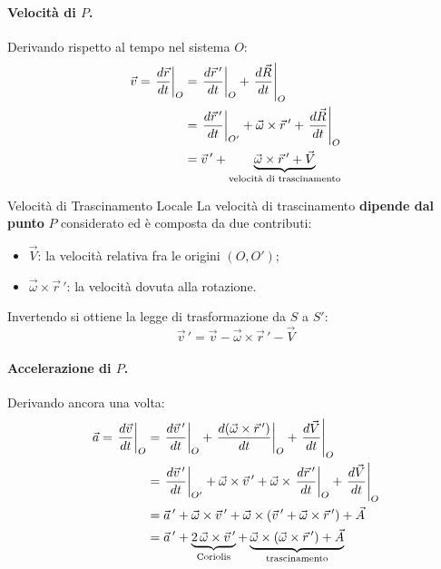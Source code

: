 \paragraph{Velocità di $P$.}
Derivando rispetto al tempo nel sistema $O$:
\begin{align}
    \vec{v} = \left.\frac{d\vec{r}}{dt}\right|_{O}
      &= \left.\frac{d\vec{r}\,'}{dt}\right|_{O} + \left.\frac{d\vec{R}}{dt}\right|_{O} \notag \\
      &= \left.\frac{d\vec{r}\,'}{dt}\right|_{O'} + \vec{\omega}\times\vec{r}\,' + \left.\frac{d\vec{R}}{dt}\right|_{O} \notag \\
      &= \vec{v}\,' + \underbrace{\vec{\omega}\times\vec{r}\,' + \vec{V}}_{\text{velocità di trascinamento}}
\end{align}

\begin{definizione}{Velocità di Trascinamento Locale}
La velocità di trascinamento \textbf{dipende dal punto} $P$ considerato ed è composta da due contributi:
\begin{itemize}[leftmargin=1.4em]
    \item $\vec{V}$: la velocità relativa fra le origini $(O, O')$;
    \item $\vec{\omega}\times\vec{r}\,'$: la velocità dovuta alla rotazione.
\end{itemize}
Invertendo si ottiene la legge di trasformazione da $S$ a $S'$:
\begin{equation}
    \vec{v}\,' = \vec{v} - \vec{\omega}\times\vec{r}\,' - \vec{V}
\end{equation}
\end{definizione}

\paragraph{Accelerazione di $P$.}
Derivando ancora una volta:
\begin{align}
    \vec{a} = \left.\frac{d\vec{v}}{dt}\right|_{O}
      &= \left.\frac{d\vec{v}\,'}{dt}\right|_{O} + \left.\frac{d(\vec{\omega}\times\vec{r}\,')}{dt}\right|_{O} + \left.\frac{d\vec{V}}{dt}\right|_{O} \notag \\
      &= \left.\frac{d\vec{v}\,'}{dt}\right|_{O'} + \vec{\omega}\times\vec{v}\,' + \vec{\omega}\times\left.\frac{d\vec{r}\,'}{dt}\right|_{O} + \left.\frac{d\vec{V}}{dt}\right|_{O} \notag \\
      &= \vec{a}\,' + \vec{\omega}\times\vec{v}\,' + \vec{\omega}\times\left(\vec{v}\,' + \vec{\omega}\times\vec{r}\,'\right) + \vec{A} \notag \\
      &= \vec{a}\,' + \underbrace{2\,\vec{\omega}\times\vec{v}\,'}_{\text{Coriolis}} + \underbrace{\vec{\omega}\times(\vec{\omega}\times\vec{r}\,') + \vec{A}}_{\text{trascinamento}}
\end{align}

